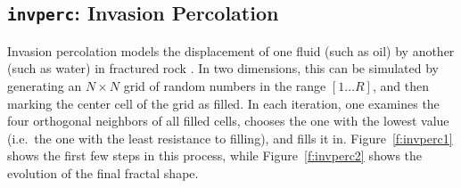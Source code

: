 \subsection{{\tt{invperc}}:
	Invasion Percolation
	\label{s:toys-invperc}}

Invasion percolation models the displacement of one fluid
(such as oil)
by another
(such as water)
in fractured rock \cite{b:percolation-theory,b:invasion-percolation}.
In two dimensions,
this can be simulated by generating
an $N{\times}N$ grid of random numbers in the range $[1{\ldots}R]$,
and then marking the center cell of the grid as filled.
In each iteration,
one examines the four orthogonal neighbors of all filled cells,
chooses the one with the lowest value
(i.e.\ the one with the least resistance to filling),
and fills it in.
Figure~\ref{f:invperc1} shows the first few steps in this process,
while Figure~\ref{f:invperc2} shows the evolution of the final fractal shape.

